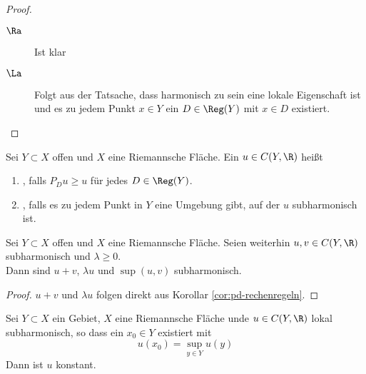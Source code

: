 \begin{proof}
  \begin{description}
  \item[$\Ra$] Ist klar
  \item[$\La$] Folgt aus der Tatsache, dass harmonisch zu sein eine
    lokale Eigenschaft ist und es zu jedem Punkt $x \in Y$ ein $D \in
    \Reg(Y)$ mit $x \in D$ existiert.
  \end{description}
\end{proof}

\begin{defin}
  Sei $Y \subset X$ offen und $X$ eine Riemannsche Fläche.
  Ein $u \in C(Y, \R)$ heißt
  \begin{enumerate}
  \item {}, falls $P_D u \geq u$ für jedes $D \in \Reg(Y)$.
  \item {}, falls es zu jedem Punkt in $Y$
    eine Umgebung gibt, auf der $u$ subharmonisch ist.
  \end{enumerate}
\end{defin}
\begin{cor}
  Sei $Y \subset X$ offen und $X$ eine Riemannsche Fläche. Seien
  weiterhin $u,v \in C(Y, \R)$ subharmonisch und $\lambda \geq 0$. \\
  Dann sind $u+v$, $\lambda u$ und $\sup(u,v)$ subharmonisch.
\end{cor}

\begin{proof}
  $u+v$ und $\lambda u$ folgen direkt aus Korollar
  \ref{cor:pd-rechenregeln}.
\end{proof}

\begin{thm}
  Sei $Y \subset X$ ein Gebiet, $X$ eine Riemannsche Fläche unde $u
  \in C(Y, \R)$ lokal subharmonisch, so dass ein $x_0 \in Y$ existiert
  mit
  \[
  u(x_0) = \sup_{y\in Y} u(y)
  \]
  Dann ist $u$ konstant.
\end{thm}

